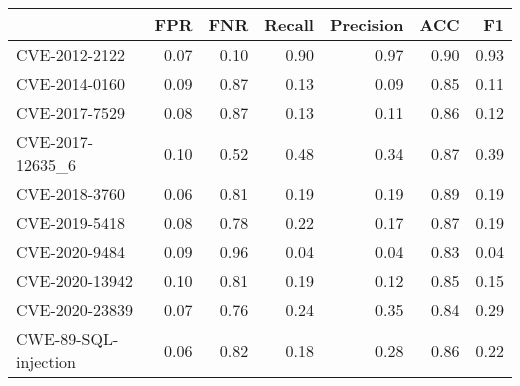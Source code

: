 \begin{tabular}{lrrrrrr}
\toprule
{} &  FPR &  FNR &  Recall &  Precision &  ACC &   F1 \\
\midrule
CVE-2012-2122        & 0.07 & 0.10 &    0.90 &       0.97 & 0.90 & 0.93 \\
CVE-2014-0160        & 0.09 & 0.87 &    0.13 &       0.09 & 0.85 & 0.11 \\
CVE-2017-7529        & 0.08 & 0.87 &    0.13 &       0.11 & 0.86 & 0.12 \\
CVE-2017-12635\_6     & 0.10 & 0.52 &    0.48 &       0.34 & 0.87 & 0.39 \\
CVE-2018-3760        & 0.06 & 0.81 &    0.19 &       0.19 & 0.89 & 0.19 \\
CVE-2019-5418        & 0.08 & 0.78 &    0.22 &       0.17 & 0.87 & 0.19 \\
CVE-2020-9484        & 0.09 & 0.96 &    0.04 &       0.04 & 0.83 & 0.04 \\
CVE-2020-13942       & 0.10 & 0.81 &    0.19 &       0.12 & 0.85 & 0.15 \\
CVE-2020-23839       & 0.07 & 0.76 &    0.24 &       0.35 & 0.84 & 0.29 \\
CWE-89-SQL-injection & 0.06 & 0.82 &    0.18 &       0.28 & 0.86 & 0.22 \\
\bottomrule
\end{tabular}
